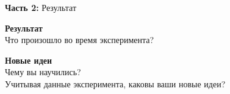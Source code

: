 \documentclass{worksheet}
\begin{document}
\begin{flushleft}
\large{\textbf{Часть 2:} Результат}
\end{flushleft}


\begin{tcolorbox}[standard jigsaw,opacityback=0, top=0mm]

\vspace{.5\baselineskip}
\parbox[][4cm][t]{18cm}{
{\textbf{\large Результат}} \\
Что произошло во время эксперимента? \\
\begin{tcolorbox}[standard jigsaw, enlarge by=-7mm, height=2.8cm, width=6cm, boxsep=4mm, flush right]
\end{tcolorbox}
}

\DrawLine

\vspace{.5\baselineskip}
\parbox[][4cm][t]{18cm}{
{\textbf{\large Новые идеи}} \\
Чему вы научились? \\
Учитывая данные эксперимента, каковы ваши новые идеи?}

\end{tcolorbox}
\end{document}
